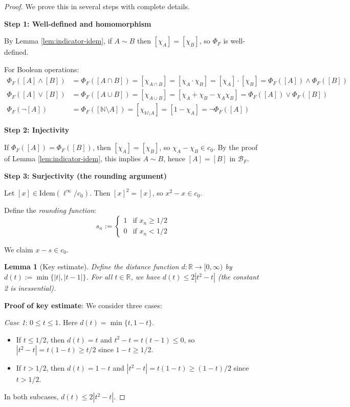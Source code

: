 \documentclass[11pt]{article}
\newtheorem{lemma}[theorem]{Lemma}
\theoremstyle{definition}
\theoremstyle{remark}
\newcommand{\N}{\mathbb{N}}
\newcommand{\R}{\mathbb{R}}
\newcommand{\cnull}{c_0}
\newcommand{\linf}{\ell^\infty}
\begin{document}
\begin{proof}
We prove this in several steps with complete details.

\textbf{Step 1: Well-defined and homomorphism}

By Lemma \ref{lem:indicator-idem}, if \(A \sim B\) then \([\chi_A] = [\chi_B]\), so \(\Phi_F\) is well-defined.

For Boolean operations:
\begin{align}
\Phi_F([A] \wedge [B]) &= \Phi_F([A \cap B]) = [\chi_{A \cap B}] = [\chi_A \cdot \chi_B] = [\chi_A] \cdot [\chi_B] = \Phi_F([A]) \wedge \Phi_F([B]) \\
\Phi_F([A] \vee [B]) &= \Phi_F([A \cup B]) = [\chi_{A \cup B}] = [\chi_A + \chi_B - \chi_A \chi_B] = \Phi_F([A]) \vee \Phi_F([B]) \\
\Phi_F(\neg[A]) &= \Phi_F([\N \setminus A]) = [\chi_{\N \setminus A}] = [1 - \chi_A] = \neg\Phi_F([A])
\end{align}

\textbf{Step 2: Injectivity}

If \(\Phi_F([A]) = \Phi_F([B])\), then \([\chi_A] = [\chi_B]\), so \(\chi_A - \chi_B \in \cnull\). By the proof of Lemma \ref{lem:indicator-idem}, this implies \(A \sim B\), hence \([A] = [B]\) in \(\mathcal B_F\).

\textbf{Step 3: Surjectivity (the rounding argument)}

Let \([x] \in \mathrm{Idem}(\linf/\cnull)\). Then \([x]^2 = [x]\), so \(x^2 - x \in \cnull\).

Define the \emph{rounding function}:
\[s_n := \begin{cases} 1 & \text{if } x_n \geq 1/2 \\ 0 & \text{if } x_n < 1/2 \end{cases}\]

We claim \(x - s \in \cnull\).

\begin{lemma}[Key estimate]
Define the distance function \(d: \R \to [0, \infty)\) by \(d(t) := \min\{|t|, |t-1|\}\). For all \(t \in \R\), we have \(d(t) \leq 2|t^2 - t|\) (the constant 2 is inessential).
\end{lemma}

\textbf{Proof of key estimate}: We consider three cases:

\emph{Case 1}: \(0 \leq t \leq 1\). Here \(d(t) = \min\{t, 1-t\}\).
\begin{itemize}
\item If \(t \leq 1/2\), then \(d(t) = t\) and \(t^2 - t = t(t-1) \leq 0\), so \(|t^2 - t| = t(1-t) \geq t/2\) since \(1-t \geq 1/2\).
\item If \(t > 1/2\), then \(d(t) = 1-t\) and \(|t^2 - t| = t(1-t) \geq (1-t)/2\) since \(t > 1/2\).
\end{itemize}
In both subcases, \(d(t) \leq 2|t^2 - t|\).


\end{proof}
\end{document}
